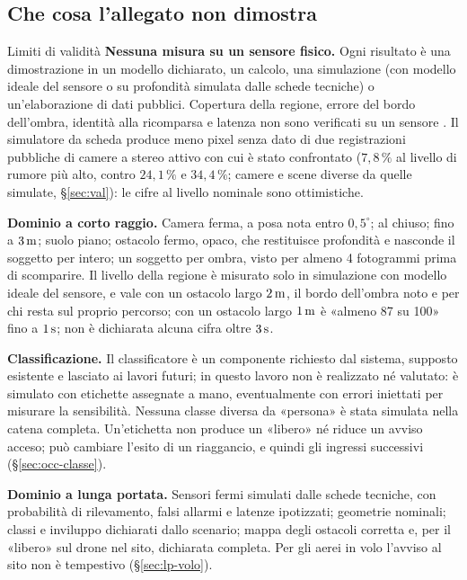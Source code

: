 \subsection{Che cosa l'allegato non dimostra}\label{sec:intro-limiti}

\begin{riquadro}{Limiti di validità}
\textbf{Nessuna misura su un sensore fisico.} Ogni risultato è una dimostrazione in un modello dichiarato, un calcolo, una simulazione (con modello ideale del sensore o su profondità simulata dalle schede tecniche) o un'elaborazione di dati pubblici. Copertura della regione, errore del bordo dell'ombra, identità alla ricomparsa e latenza non sono verificati su un sensore . Il simulatore da scheda produce meno pixel senza dato di due registrazioni pubbliche di camere a stereo attivo con cui è stato confrontato ($7{,}8\,\%$ al livello di rumore più alto, contro $24{,}1\,\%$ e $34{,}4\,\%$; camere e scene diverse da quelle simulate, \S\ref{sec:val}): le cifre al livello nominale sono ottimistiche.

\textbf{Dominio a corto raggio.} Camera ferma, a posa nota entro $0{,}5^\circ$; al chiuso; fino a $3\,\mathrm{m}$; suolo piano; ostacolo fermo, opaco, che restituisce profondità e nasconde il soggetto per intero; un soggetto per ombra, visto per almeno 4 fotogrammi prima di scomparire. Il livello della regione è misurato solo in simulazione con modello ideale del sensore, e vale con un ostacolo largo $2\,\mathrm{m}$, il bordo dell'ombra noto e per chi resta sul proprio percorso; con un ostacolo largo $1\,\mathrm{m}$ è «almeno 87 su 100» fino a $1\,\mathrm{s}$; non è dichiarata alcuna cifra oltre $3\,\mathrm{s}$.

\textbf{Classificazione.} Il classificatore è un componente richiesto dal sistema, supposto esistente e lasciato ai lavori futuri; in questo lavoro non è realizzato né valutato: è simulato con etichette assegnate a mano, eventualmente con errori iniettati per misurare la sensibilità. Nessuna classe diversa da «persona» è stata simulata nella catena completa. Un'etichetta non produce un «libero» né riduce un avviso acceso; può cambiare l'esito di un riaggancio, e quindi gli ingressi successivi (\S\ref{sec:occ-classe}).

\textbf{Dominio a lunga portata.} Sensori fermi simulati dalle schede tecniche, con probabilità di rilevamento, falsi allarmi e latenze ipotizzati; geometrie nominali; classi e inviluppo dichiarati dallo scenario; mappa degli ostacoli corretta e, per il «libero» sul drone nel sito, dichiarata completa. Per gli aerei in volo l'avviso al sito non è tempestivo (\S\ref{sec:lp-volo}).


\end{riquadro}
